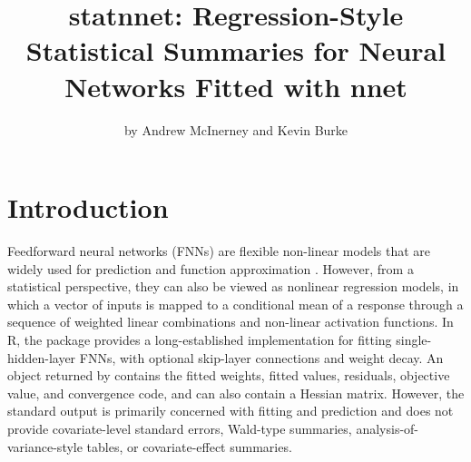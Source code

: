 \title{statnnet: Regression-Style Statistical Summaries for Neural Networks Fitted with nnet}


\author{by Andrew McInerney and Kevin Burke}

\maketitle


\section{Introduction}\label{introduction}

Feedforward neural networks (FNNs) are flexible non-linear models that are widely used for prediction and function approximation \citep{lecun2015deep}.
However, from a statistical perspective, they can also be viewed as nonlinear regression models, in which a vector of inputs is mapped to a conditional mean of a response through a sequence of weighted linear combinations and non-linear activation functions.
In R, the  package \citep{nnet} provides a long-established implementation for fitting single-hidden-layer FNNs, with optional skip-layer connections and weight decay.
An object returned by  contains the fitted weights, fitted values, residuals, objective value, and convergence code, and can also contain a Hessian matrix.
However, the standard output is primarily concerned with fitting and prediction and does not provide covariate-level standard errors, Wald-type summaries, analysis-of-variance-style tables, or covariate-effect summaries.

